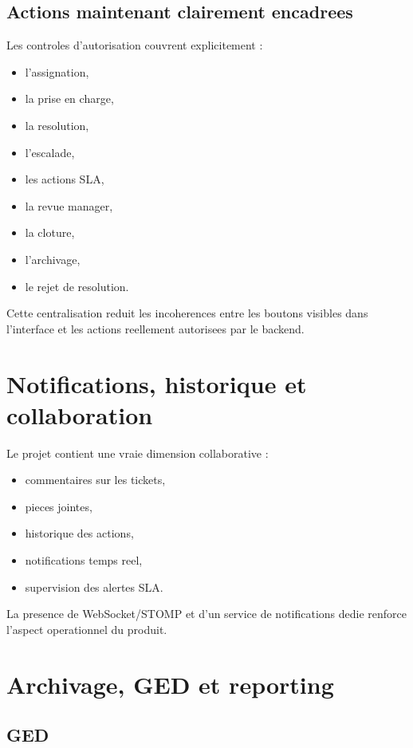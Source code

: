 \documentclass[12pt,a4paper]{article}
\begin{document}
\subsection{Actions maintenant clairement encadrees}

Les controles d'autorisation couvrent explicitement :

\begin{itemize}[leftmargin=1.2cm]
  \item l'assignation,
  \item la prise en charge,
  \item la resolution,
  \item l'escalade,
  \item les actions SLA,
  \item la revue manager,
  \item la cloture,
  \item l'archivage,
  \item le rejet de resolution.
\end{itemize}

Cette centralisation reduit les incoherences entre les boutons visibles dans l'interface et les actions reellement autorisees par le backend.

\section{Notifications, historique et collaboration}

Le projet contient une vraie dimension collaborative :

\begin{itemize}[leftmargin=1.2cm]
  \item commentaires sur les tickets,
  \item pieces jointes,
  \item historique des actions,
  \item notifications temps reel,
  \item supervision des alertes SLA.
\end{itemize}

La presence de WebSocket/STOMP et d'un service de notifications dedie renforce l'aspect operationnel du produit.

\section{Archivage, GED et reporting}

\subsection{GED}
\end{document}
